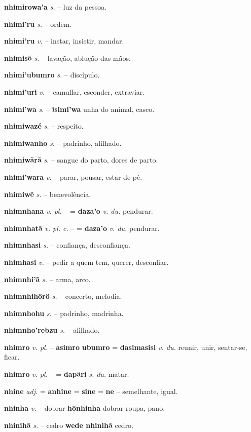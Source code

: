\textbf{nhimirowa'a} \textit{s.} -- luz da pessoa.

\textbf{nhimi'ru} \textit{s.} -- ordem.

\textbf{nhimi'ru} \textit{v.} -- instar, insistir, mandar.

\textbf{nhimisõ} \textit{s.} -- lavação, ablução das mãos.

\textbf{nhimi'ubumro} \textit{s.} -- discípulo.

\textbf{nhimi'uri} \textit{v.} -- camuflar, esconder, extraviar.

\textbf{nhimi'wa} \textit{s.} -- \textbf{ĩsimi'wa} unha do animal, casco.

\textbf{nhimiwazé} \textit{s.} -- respeito.

\textbf{nhimiwanho} \textit{s.} -- padrinho, afilhado.

\textbf{nhimiwãrã} \textit{s.} -- sangue do parto, dores de parto.

\textbf{nhimi'wara} \textit{v.} -- parar, pousar, estar de pé.

\textbf{nhimiwẽ} \textit{s.} -- benevolência.

\textbf{nhimnhana} \textit{v. pl.} -- = \textbf{daza'o} \textit{v. du.} pendurar.

\textbf{nhimnhatã} \textit{v. pl. c.} -- = \textbf{daza'o} \textit{v. du.} pendurar.

\textbf{nhimnhasi} \textit{s.} -- confiança, desconfiança.

\textbf{nhimhasi} \textit{v.} -- pedir a quem tem, querer, desconfiar.

\textbf{nhimnhi'ã} \textit{s.} -- arma, arco.

\textbf{nhimnhihörö} \textit{s.} -- concerto, melodia.

\textbf{nhimnhohu} \textit{s.} -- padrinho, madrinha.

\textbf{nhimnho'rebzu} \textit{s.} -- afilhado.

\textbf{nhimro} \textit{v. pl.} -- \textbf{asimro} \textbf{ubumro} = \textbf{dasimasisi} \textit{v. du.} reunir, unir, sentar-se, ficar.

\textbf{nhimro} \textit{v. pl.} -- = \textbf{dapãri} \textit{s. du.} matar.

\textbf{nhine} \textit{adj.} = \textbf{anhine} = \textbf{sine} = \textbf{ne} -- semelhante, igual.

\textbf{nhinha} \textit{v.} -- dobrar  \textbf{hönhinha} dobrar roupa, pano.

\textbf{nhinihã} \textit{s.} -- cedro  \textbf{wede nhinihã} cedro.

